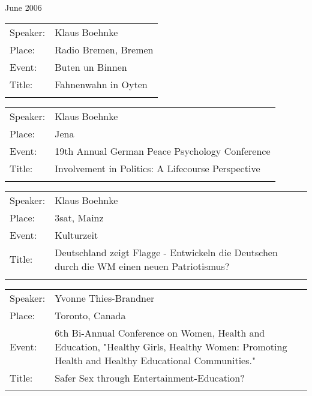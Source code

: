 {\begin{flushleft}
June 2006\\[0.5cm] 
\end{flushleft}
\begin{tabular}{lp{13.4cm}}
 Speaker:	&   Klaus Boehnke \\
 Place: 	 &Radio Bremen, Bremen\\
 Event:   &	Buten un Binnen\\
 Title: &	Fahnenwahn in Oyten\\ \\
\end{tabular}
\begin{tabular}{lp{13.4cm}}
 Speaker:	&   Klaus Boehnke \\
 Place: 	 &Jena\\
 Event:   &	19th Annual German Peace Psychology Conference\\
 Title: &	Involvement in Politics: A Lifecourse Perspective\\ \\
\end{tabular}
\begin{tabular}{lp{13.4cm}}
 Speaker:	&   Klaus Boehnke \\
 Place: 	 &3sat, Mainz\\
 Event:   &	Kulturzeit\\
 Title: &	Deutschland zeigt Flagge - Entwickeln die Deutschen durch die WM einen neuen Patriotismus?\\ \\
\end{tabular}
\begin{tabular}{lp{13.4cm}}
 Speaker:	&   Yvonne Thies-Brandner\\
 Place: 	 &Toronto, Canada\\
 Event:   &	6th Bi-Annual Conference on Women, Health and Education, "Healthy Girls, Healthy Women: Promoting Health and Healthy Educational Communities."\\
 Title: &	Safer Sex through Entertainment-Education?\\ \\
\end{tabular}





}
